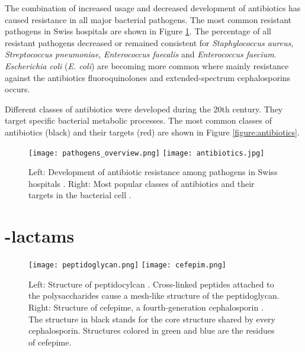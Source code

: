 The combination of increased usage and decreased development of antibiotics has caused resistance in all major bacterial pathogens. The most common resistant pathogens in Swiss hospitals are shown in Figure \ref{figure:pathogen_dvelopment}. The percentage of all resistant pathogens decreased or remained consistent for \textit{Staphylococcus aureus}, \textit{Streptococcus pneumoniae}, \textit{Enterococcus faecalis} and \textit{Enterococcus faecium}. \textit{Escherichia coli} (\textit{E. coli}) are becoming more common where mainly resistance against the antibiotics fluoroquinolones and extended-spectrum cephalosporins occurs. 

Different classes of antibiotics were developed during the 20th century. They target specific bacterial metabolic processes. The most common classes of antibiotics (black) and their targets (red) are shown in Figure \ref{figure:antibiotics}.
\begin{figure}
	\texttt{[image: pathogens\_overview.png]}
	\texttt{[image: antibiotics.jpg]}
	\caption{Left: Development of antibiotic resistance among pathogens in Swiss hospitals \cite{swiss_hospitals_pathogens}. Right: Most popular classes of antibiotics and their targets in the bacterial cell \cite{wright_english:_2010}.}
	\label{figure:pathogen_dvelopment}
\end{figure}
\newpage
\section{\textbeta-lactams}
\begin{figure}[b]
	\texttt{[image: peptidoglycan.png]}
	\texttt{[image: cefepim.png]}
	\caption{Left: Structure of peptidocylcan \cite{noauthor_bacteria:_nodate}. Cross-linked peptides attached to the polysaccharides cause a mesh-like structure of the peptidoglycan. Right: Structure of cefepime, a fourth-generation cephalosporin \cite{noauthor_datei:cefepim_nodate}. The structure in black stands for the core structure shared by every cephalosporin. Structures colored in green and blue are the residues of cefepime.}
	\label{figure:antibiotics}
	\label{figure:cefepim}
\end{figure}

